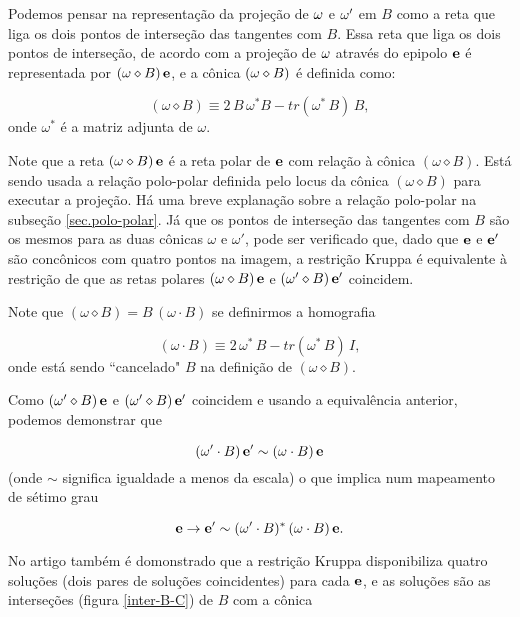 Podemos pensar na representação da projeção de  ${\bf \omega}$ e ${\bf \omega'}$ em $B$ como a reta que liga os dois pontos de interseção das tangentes com $B$. Essa reta que liga os dois pontos de interseção, de acordo com a projeção de ${\bf \omega}$ através do epipolo ${\bf e}$ é representada por $({\bf \omega}\diamond B)\,{\bf e}$, e a cônica $({\bf \omega}\diamond B)$ é definida como:

\begin{equation}
(\omega \diamond B)\equiv 2\,B\,\omega^*B - tr(\omega^*\,B)\,B,
\end{equation}
onde $\omega^*$ é a matriz adjunta de $\omega$.

Note que a reta $(\omega \diamond B)\,{\bf e}$ é a reta polar de ${\bf e}$ com relação à cônica $(\omega \diamond B)$. Está sendo usada a relação polo-polar definida pelo locus da cônica $(\omega \diamond B)$ para executar a projeção. Há uma breve explanação sobre a relação polo-polar na subseção \ref{sec.polo-polar}. Já que os pontos de interseção das tangentes com $B$ são os mesmos para as duas cônicas $\omega$ e $\omega'$, pode ser verificado que, dado que ${\bf e}$ e ${\bf e'}$ são concônicos com quatro pontos na imagem, a restrição Kruppa é equivalente à restrição de que as retas polares $(\omega \diamond B)\,{\bf e}$ e $(\omega' \diamond B)\,{\bf e'}$ coincidem.


Note que $(\omega \diamond B) = B\,(\omega \cdot B)$ se definirmos a homografia

\begin{equation}
(\omega \cdot B) \equiv 2\,\omega^*\,B - tr(\omega^*\,B)\,I,
\end{equation}
onde está sendo ``cancelado" $B$ na definição de $(\omega \diamond B)$. 


Como $(\omega' \diamond B)\,{\bf e}$ e $(\omega' \diamond B)\,{\bf e'}$ coincidem e usando a equivalência anterior, podemos demonstrar que 

\begin{equation}
(\omega' \cdot B)\,{\bf e'} \sim (\omega \cdot B)\,{\bf e}
\end{equation} 
(onde $\sim$ significa igualdade a menos da escala) o que implica num mapeamento de sétimo grau 

\begin{equation}
{\bf e} \rightarrow {\bf e'} \sim (\omega' \cdot B)^*\,(\omega \cdot B)\,{\bf e}.
\label{funcao-de-e}
\end{equation}

No artigo também é domonstrado que a restrição Kruppa disponibiliza quatro soluções (dois pares de soluções coincidentes) para cada ${\bf e}$, e as soluções são as interseções (figura \ref{inter-B-C}) de $B$ com a cônica 


